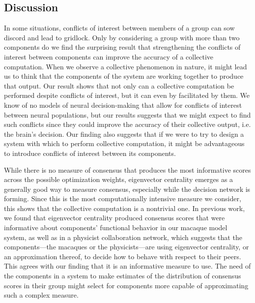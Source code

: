 \documentclass{pnastwo}
\begin{document}
\begin{article}
\section{Discussion}

In some situations, conflicts of interest between members of a group can sow discord and lead to gridlock.  Only by considering a group with more than two components do we find the surprising result that strengthening the conflicts of interest between components can improve the accuracy of a collective computation. When we observe a collective phenomenon in nature, it might lead us to think that the components of the system are working together to produce that output. Our result shows that not only can a collective computation be performed despite conflicts of interest, but it can even by facilitated by them.  We know of no models of neural decision-making that allow for conflicts of interest between neural populations, but our results suggests that we might expect to find such conflicts since they could improve the accuracy of their collective output, i.e. the brain's decision. Our finding also suggests that if we were to try to design a system with which to perform collective computation, it might be advantageous to introduce conflicts of interest between its components.

While there is no measure of consensus that produces the most informative scores across the possible optimization weights, eigenvector centrality emerges as a generally good way to measure consensus, especially while the decision network is forming. Since this is the most computationally intensive measure we consider, this shows that the collective computation is a nontrivial one. In previous work, we found that eigenvector centrality produced consensus scores that were informative about components' functional behavior in our macaque model system, as well as in a physicist collaboration network, which suggests that the components---the macaques or the physicists---are using eigenvector centrality, or an approximation thereof, to decide how to behave with respect to their peers. This agrees with our finding that it is an informative measure to use. The need of the components in a system to make estimates of the distribution of consensus scores in their group might select for components more capable of approximating such a complex measure.



\end{article}
\end{document}
